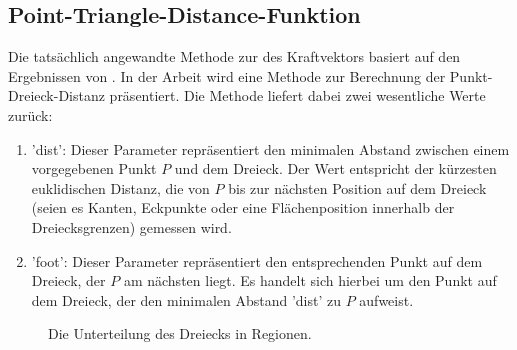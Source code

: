 \documentclass[conference]{IEEEtran}
\begin{document}
\subsection{Point-Triangle-Distance-Funktion}\label{dist}
Die tatsächlich angewandte Methode zur des Kraftvektors basiert auf den Ergebnissen von . In der Arbeit wird eine Methode zur Berechnung der Punkt-Dreieck-Distanz präsentiert. Die Methode liefert dabei zwei wesentliche Werte zurück:

\begin{enumerate}
\item 'dist': Dieser Parameter repräsentiert den minimalen Abstand zwischen einem vorgegebenen Punkt $P$ und dem Dreieck. Der Wert entspricht der kürzesten euklidischen Distanz, die von $P$ bis zur nächsten Position auf dem Dreieck (seien es Kanten, Eckpunkte oder eine Flächenposition innerhalb der Dreiecksgrenzen) gemessen wird.
\item 'foot': Dieser Parameter repräsentiert den entsprechenden Punkt auf dem Dreieck, der $P$ am nächsten liegt. Es handelt sich hierbei um den Punkt auf dem Dreieck, der den minimalen Abstand 'dist' zu $P$ aufweist.
\end{enumerate}

\begin{figure}[h] 
    \centering
    \caption{Die Unterteilung des Dreiecks in Regionen.}
    \label{fig:regions}
\end{figure}
\end{document}
